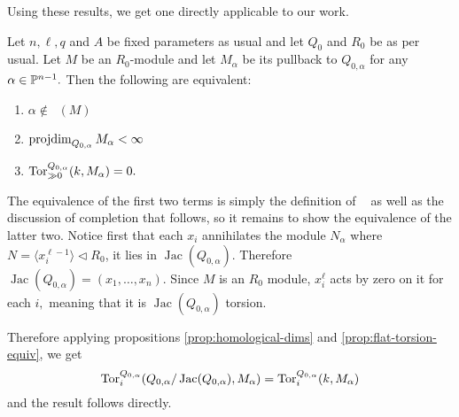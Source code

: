 \documentclass [11pt, proquest] {uwthesis}[2020/02/24]
\DeclareMathOperator{\supph}{supp^\mathit{hyp}}
\begin{document}
    Using these results, we get one directly applicable to our work.
    \begin{cor}\label{cor:hypersurfaces-tor}
        Let $n,\ell,q$ and $A$ be fixed parameters as usual and let $Q_0$ and $R_0$ be as per usual. Let $M$ be an $R_0$-module and let $M_\alpha$ be its pullback to $Q_{0,\alpha}$ for any $\alpha\in\mathbb{P}^{n-1}.$ Then the following are equivalent:
        \begin{enumerate}
            \item $\alpha\notin\supph(M)$
            \item $\operatorname{projdim}_{Q_{0,\alpha}} M_\alpha < \infty$
            \item $\operatorname{Tor}_{\gg 0}^{Q_{0,\alpha}}(k,M_\alpha)=0.$
        \end{enumerate}
    \end{cor}
    \begin{prf}
        The equivalence of the first two terms is simply the definition of $\supph$ as well as the discussion of completion that follows, so it remains to show the equivalence of the latter two. Notice first that each $x_i$ annihilates the module $N_\alpha$ where $N=\langle x_i^{\ell-1}\rangle\lhd R_0$, it lies in $\operatorname{Jac}(Q_{0,\alpha})$. Therefore $\operatorname{Jac}(Q_{0,\alpha})=(x_1,\dots,x_n).$ Since $M$ is an $R_0$ module, $x_i^\ell$ acts by zero on it for each $i,$ meaning that it is $\operatorname{Jac}(Q_{0,\alpha})$ torsion. 
        
        Therefore applying propositions \ref{prop:homological-dims} and \ref{prop:flat-torsion-equiv}, we get
        \[\operatorname{Tor}_i^{Q_{0,\alpha}}(Q_{0,\alpha}/\operatorname{Jac}(Q_{0,\alpha}),M_\alpha)=\operatorname{Tor}_i^{Q_{0,\alpha}}(k,M_\alpha)\]
        and the result follows directly.
    \end{prf}
    
\end{document}
